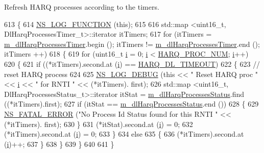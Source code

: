 Refresh H\+A\+RQ processes according to the timers. 


\begin{DoxyCode}
613 \{
614   \hyperlink{log-macros-disabled_8h_a90b90d5bad1f39cb1b64923ea94c0761}{NS\_LOG\_FUNCTION} (\textcolor{keyword}{this});
615 
616   std::map <uint16\_t, DlHarqProcessesTimer\_t>::iterator itTimers;
617   \textcolor{keywordflow}{for} (itTimers = \hyperlink{classns3_1_1TdBetFfMacScheduler_a6421f37924ac8b08b528aec9e7386678}{m\_dlHarqProcessesTimer}.begin (); itTimers != 
      \hyperlink{classns3_1_1TdBetFfMacScheduler_a6421f37924ac8b08b528aec9e7386678}{m\_dlHarqProcessesTimer}.end (); itTimers ++)
618     \{
619       \textcolor{keywordflow}{for} (uint16\_t \hyperlink{bernuolliDistribution_8m_a6f6ccfcf58b31cb6412107d9d5281426}{i} = 0; \hyperlink{bernuolliDistribution_8m_a6f6ccfcf58b31cb6412107d9d5281426}{i} < \hyperlink{cqa-ff-mac-scheduler_8h_a9185d8d7d2b2979181d4a7044a3d3555}{HARQ\_PROC\_NUM}; \hyperlink{bernuolliDistribution_8m_a6f6ccfcf58b31cb6412107d9d5281426}{i}++)
620         \{
621           \textcolor{keywordflow}{if} ((*itTimers).second.at (\hyperlink{bernuolliDistribution_8m_a6f6ccfcf58b31cb6412107d9d5281426}{i}) == \hyperlink{cqa-ff-mac-scheduler_8h_add9e0c4889dc1b5b25686480b31ad166}{HARQ\_DL\_TIMEOUT})
622             \{
623               \textcolor{comment}{// reset HARQ process}
624               
625               \hyperlink{group__logging_ga413f1886406d49f59a6a0a89b77b4d0a}{NS\_LOG\_DEBUG} (\textcolor{keyword}{this} << \textcolor{stringliteral}{" Reset HARQ proc "} << \hyperlink{bernuolliDistribution_8m_a6f6ccfcf58b31cb6412107d9d5281426}{i} << \textcolor{stringliteral}{" for RNTI "} << (*itTimers).
      first);
626               std::map <uint16\_t, DlHarqProcessesStatus\_t>::iterator itStat = 
      \hyperlink{classns3_1_1TdBetFfMacScheduler_af9f2ffd80c6d473a5ccee8fb153d40f6}{m\_dlHarqProcessesStatus}.find ((*itTimers).first);
627               \textcolor{keywordflow}{if} (itStat == \hyperlink{classns3_1_1TdBetFfMacScheduler_af9f2ffd80c6d473a5ccee8fb153d40f6}{m\_dlHarqProcessesStatus}.end ())
628                 \{
629                   \hyperlink{group__fatal_ga5131d5e3f75d7d4cbfd706ac456fdc85}{NS\_FATAL\_ERROR} (\textcolor{stringliteral}{"No Process Id Status found for this RNTI "} << (*itTimers).
      first);
630                 \}
631               (*itStat).second.at (\hyperlink{bernuolliDistribution_8m_a6f6ccfcf58b31cb6412107d9d5281426}{i}) = 0;
632               (*itTimers).second.at (\hyperlink{bernuolliDistribution_8m_a6f6ccfcf58b31cb6412107d9d5281426}{i}) = 0;
633             \}
634           \textcolor{keywordflow}{else}
635             \{
636               (*itTimers).second.at (\hyperlink{bernuolliDistribution_8m_a6f6ccfcf58b31cb6412107d9d5281426}{i})++;
637             \}
638         \}
639     \}
640   
641 \}
\end{DoxyCode}


